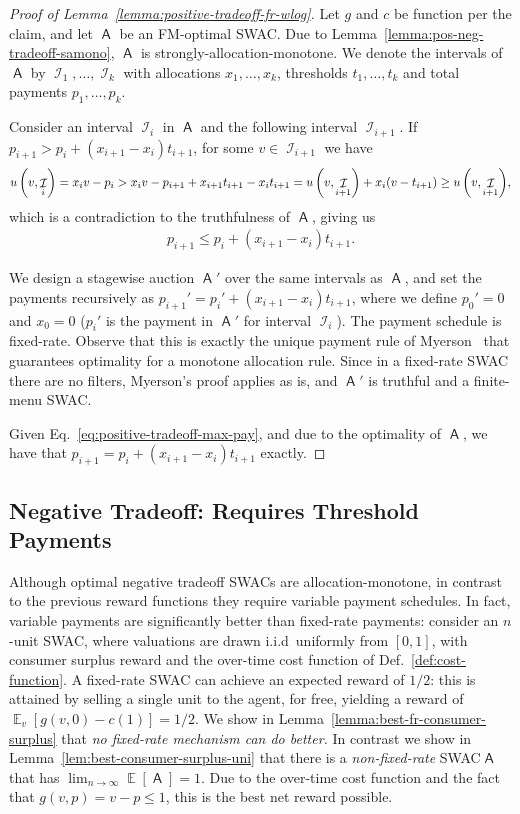 \documentclass[11pt,letterpaper]{article}
\newcommand{\samono}{strongly-allocation-monotone\xspace}
\newcommand{\amono}{allocation-monotone\xspace}
\newcommand{\fr}{fixed-rate\xspace}
\newcommand{\swac}{SWAC\xspace}
\newcommand{\swacs}{SWACs\xspace}
\newcommand{\finauc}{finite-menu \swac}
\DeclareMathOperator*{\E}{\bb{E}}
\newcommand{\bb}[1]{\mathbb{#1}}
\DeclareMathOperator{\A}{\auc{A}}
\DeclareMathOperator{\I}{\mathcal{I}}
\newcommand{\g}{g}
\theoremstyle{plain}
\newcommand{\auc}[1]{\mathsf{#1}}
\begin{document}
\begin{proof}[Proof of Lemma~\ref{lemma:positive-tradeoff-fr-wlog}]
    Let $\g$ and $c$ be function per the claim, and let $\A$ be an FM-optimal \swac. Due to Lemma~\ref{lemma:pos-neg-tradeoff-samono}, $\A$ is \samono. We denote the intervals of $\A$ by $\I_1,\dots,\I_k$ with allocations $x_1,\dots,x_k$, thresholds $t_1,\dots,t_k$ and total payments $p_1,\dots,p_k$.

    Consider an interval $\I_i$ in $\A$ and the following interval $\I_{i+1}$. If $p_{i+1}>p_i+(x_{i+1}-x_i)t_{i+1}$, for some $v\in\I_{i+1}$ we have
    \begin{align*}
        \util{v}{\I_i}=x_iv-p_i>x_iv-p_{i+1}+x_{i+1}t_{i+1}-x_it_{i+1}=\util{v}{\I_{i+1}}+x_i(v-t_{i+1})\geq \util{v}{\I_{i+1}},
    \end{align*}
    which is a contradiction to the truthfulness of $\A$, giving us
    \begin{align}\label{eq:positive-tradeoff-max-pay}
        p_{i+1}\leq p_i+(x_{i+1}-x_i)t_{i+1}.
    \end{align}

    We design a stagewise auction $\A'$ over the same intervals as $\A$, and set the payments recursively as ${p_{i+1}'=p_i'+(x_{i+1}-x_i)t_{i+1}}$, where we define $p_0'=0$ and $x_0=0$ ($p_i'$ is the payment in $\A'$ for interval $\I_i$). The payment schedule is \fr. Observe that this is exactly the unique payment rule of Myerson~\cite{myerson1981optimal} that guarantees optimality for a monotone allocation rule. Since in a \fr \swac there are no filters, Myerson's proof applies as is, and $\A'$ is truthful and a \finauc.

    Given Eq.~\ref{eq:positive-tradeoff-max-pay}, and due to the optimality of $\A$, we have that $p_{i+1}= p_i+(x_{i+1}-x_i)t_{i+1}$ exactly.  
\end{proof}


\subsection{Negative Tradeoff: Requires Threshold Payments} Although optimal negative tradeoff \swacs are \amono, in contrast to the previous reward functions they require variable payment schedules. In fact, variable payments are significantly better than \fr payments:
consider an $n$-unit \swac,
where valuations are drawn i.i.d\ uniformly from \([0,1]\),
with consumer surplus reward and the over-time cost function of Def.~\ref{def:cost-function}.
A \fr \swac can achieve an expected reward of \(1/2\):
this is attained by selling a single unit to the agent,
for free, yielding a reward of $\E_v[g(v, 0)-c(1)] =1/2$.
We show in Lemma~\ref{lemma:best-fr-consumer-surplus}
that \emph{no fixed-rate mechanism can do better.}  
In contrast we show in Lemma~\ref{lem:best-consumer-surplus-uni} that there is a \emph{non-fixed-rate} \swac \(\A\) that has
$\lim_{n\rightarrow\infty}{\E[\A]}=1$.
Due to the over-time cost function
and the fact that $g(v,p) = v - p \leq 1$,
this is the best net reward possible.
\end{document}
